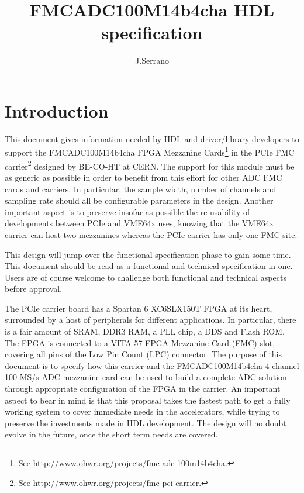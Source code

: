 \documentclass{article}
\title{FMCADC100M14b4cha HDL specification}
\author{J.Serrano}
\begin{document}
\maketitle


\section{Introduction}
This document gives information needed by HDL and driver/library developers to support the FMCADC100M14b4cha FPGA Mezzanine Cards\footnote{See \href{http://www.ohwr.org/projects/fmc-adc-100m14b4cha}{http://www.ohwr.org/projects/fmc-adc-100m14b4cha}.} in the PCIe FMC carrier\footnote{See \href{http://www.ohwr.org/projects/fmc-pci-carrier}{http://www.ohwr.org/projects/fmc-pci-carrier}.} designed by BE-CO-HT at CERN. The support for this module must be as generic as possible in order to benefit from this effort for other ADC FMC cards and carriers. In particular, the sample width, number of channels and sampling rate should all be configurable parameters in the design. Another important aspect is to preserve insofar as possible the re-usability of developments between PCIe and VME64x uses, knowing that the VME64x carrier can host two mezzanines whereas the PCIe carrier has only one FMC site.

This design will jump over the functional specification phase to gain some time. This document should be read as a functional and technical specification in one. Users are of course welcome to challenge both functional and technical aspects before approval.

The PCIe carrier board has a Spartan 6 XC6SLX150T FPGA at its heart, surrounded by a host of peripherals for different applications. In particular, there is a fair amount of SRAM, DDR3 RAM, a PLL chip, a DDS and Flash ROM. The FPGA is connected to a VITA 57 FPGA Mezzanine Card (FMC) slot, covering all pins of the Low Pin Count (LPC) connector. The purpose of this document is to specify how this carrier and the FMCADC100M14b4cha 4-channel 100 MS/s ADC mezzanine card can be used to build a complete ADC solution through appropriate configuration of the FPGA in the carrier. An important aspect to bear in mind is that this proposal takes the fastest path to get a fully working system to cover immediate needs in the accelerators, while trying to preserve the investments made in HDL development. The design will no doubt evolve in the future, once the short term needs are covered.
\end{document}
